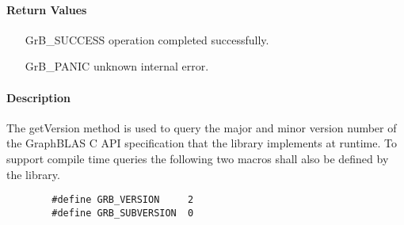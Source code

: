 \paragraph{Return Values}

\begin{itemize}[leftmargin=2.1in]
\item[{\sf GrB\_SUCCESS}]        operation completed successfully.
\item[{\sf GrB\_PANIC}]          unknown internal error.
\end{itemize}

\paragraph{Description}

The {\sf getVersion} method is used to query the major and minor version number of the
GraphBLAS C API specification that the library implements at runtime.  To
support compile time queries the following two macros shall also be defined by
the library.
\begin{verbatim}
        #define GRB_VERSION     2
        #define GRB_SUBVERSION  0
\end{verbatim}
